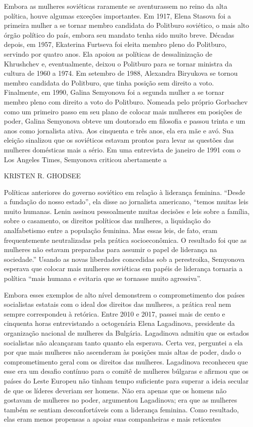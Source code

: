 Embora as mulheres soviéticas raramente se aventurassem no reino da alta política, houve algumas exceções importantes. Em 1917, Elena Stasova foi a primeira mulher a se tornar membro candidata do Politburo soviético, o mais alto órgão político do país, embora seu mandato tenha sido muito breve. Décadas depois, em 1957, Ekaterina Furtseva foi eleita membro pleno do Politburo, servindo por quatro anos. Ela apoiou as políticas de dessalinização de Khrushchev e, eventualmente, deixou o Politburo para se tornar ministra da cultura de 1960 a 1974. Em setembro de 1988, Alexandra Biryukova se tornou membro candidata do Politburo, que tinha posição sem direito a voto. Finalmente, em 1990, Galina Semyonova foi a segunda mulher a se tornar membro pleno com direito a voto do Politburo. Nomeada pelo próprio Gorbachev como um primeiro passo em seu plano de colocar mais mulheres em posições de poder, Galina Semyonova obteve um doutorado em filosofia e passou trinta e um anos como jornalista ativa. Aos cinquenta e três anos, ela era mãe e avó. Sua eleição sinalizou que os soviéticos estavam prontos para levar as questões das mulheres domésticas mais a sério. Em uma entrevista de janeiro de 1991 com o Los Angeles Times, Semyonova criticou abertamente a
 \par 
KRISTEN R. GHODSEE
 \par 
Políticas anteriores do governo soviético em relação à liderança feminina. “Desde a fundação do nosso estado”, ela disse ao jornalista americano, “temos muitas leis muito humanas. Lenin assinou pessoalmente muitas decisões e leis sobre a família, sobre o casamento, os direitos políticos das mulheres, a liquidação do analfabetismo entre a população feminina. Mas essas leis, de fato, eram frequentemente neutralizadas pela prática socioeconômica. O resultado foi que as mulheres não estavam preparadas para assumir o papel de liderança na sociedade.” Usando as novas liberdades concedidas sob a perestroika, Semyonova esperava que colocar mais mulheres soviéticas em papéis de liderança tornaria a política “mais humana e evitaria que se tornasse muito agressiva”.
 \par 
Embora esses exemplos de alto nível demonstrem o comprometimento dos países socialistas estatais com o ideal dos direitos das mulheres, a prática real nem sempre correspondeu à retórica. Entre 2010 e 2017, passei mais de cento e cinquenta horas entrevistando a octogenária Elena Lagadinova, presidente da organização nacional de mulheres da Bulgária. Lagadinova admitiu que os estados socialistas não alcançaram tanto quanto ela esperava. Certa vez, perguntei a ela por que mais mulheres não ascenderam às posições mais altas de poder, dado o comprometimento geral com os direitos das mulheres. Lagadinova reconheceu que esse era um desafio contínuo para o comitê de mulheres búlgaras e afirmou que os países do Leste Europeu não tinham tempo suficiente para superar a ideia secular de que os líderes deveriam ser homens. Não era apenas que os homens não gostavam de mulheres no poder, argumentou Lagadinova; era que as mulheres também se sentiam desconfortáveis ​​com a liderança feminina. Como resultado, elas eram menos propensas a apoiar suas companheiras e mais reticentes

